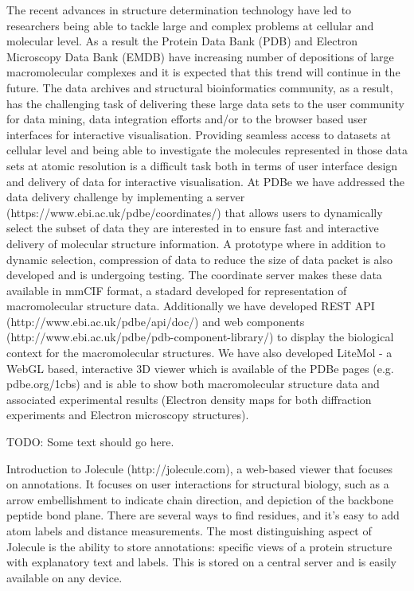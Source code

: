\documentclass[a4paper]{article}
\begin{document}
The recent advances in structure determination technology have led to researchers being able to tackle large and complex problems at cellular and molecular level. As a result the Protein Data Bank (PDB) and Electron Microscopy Data Bank (EMDB) have increasing number of depositions of large macromolecular complexes and it is expected that this trend will continue in the future. The data archives and structural bioinformatics community, as a result, has the challenging task of delivering these large data sets to the user community for data mining, data integration efforts and/or to the browser based user interfaces for interactive visualisation. Providing seamless access to datasets at cellular level and being able to investigate the molecules represented in those data sets at atomic resolution is a difficult task both in terms of user interface design and delivery of data for interactive visualisation. At PDBe we have addressed the data delivery challenge by implementing a server (https://www.ebi.ac.uk/pdbe/coordinates/) that allows users to dynamically select the subset of data they are interested in to ensure fast and interactive delivery of molecular structure information. A prototype where in addition to dynamic selection, compression of data to reduce the size of data packet is also developed and is undergoing testing. The coordinate server makes these data available in mmCIF format, a stadard developed for representation of macromolecular structure data. Additionally we have developed REST API (http://www.ebi.ac.uk/pdbe/api/doc/) and web components (http://www.ebi.ac.uk/pdbe/pdb-component-library/) to display the biological context for the macromolecular structures. We have also developed LiteMol - a WebGL based, interactive 3D viewer which is available of the PDBe pages (e.g. pdbe.org/1cbs) and is able to show both macromolecular structure data and associated experimental results (Electron density maps for both diffraction experiments and Electron microscopy structures).



TODO: Some text should go here.



Introduction to Jolecule (http://jolecule.com), a web-based viewer that focuses on annotations. It focuses on user interactions for structural biology, such as a  arrow embellishment to indicate chain direction, and depiction of the backbone peptide bond plane. There are several ways to find residues, and it's easy to add atom labels and distance measurements. The most distinguishing aspect of Jolecule is the ability to store annotations: specific views of a protein structure with explanatory text and labels. This is stored on a central server and is easily available on any device.
\end{document}
